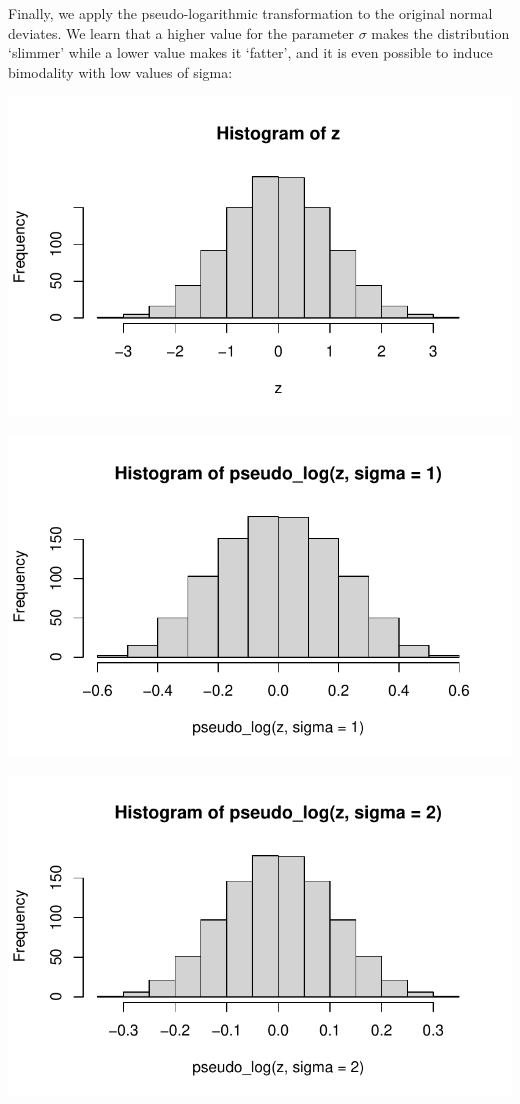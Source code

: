 \documentclass[
  letterpaper,
  DIV=11,
  numbers=noendperiod]{scrreport}
\begin{document}
Finally, we apply the pseudo-logarithmic transformation to the original
normal deviates. We learn that a higher value for the parameter
\(\sigma\) makes the distribution `slimmer' while a lower value makes it
`fatter', and it is even possible to induce bimodality with low values
of sigma:

\includegraphics{./Pseudo_log_explainer_files/figure-pdf/pl05-1.pdf}

\includegraphics{./Pseudo_log_explainer_files/figure-pdf/pl05-2.pdf}

\includegraphics{./Pseudo_log_explainer_files/figure-pdf/pl05-3.pdf}
\end{document}
